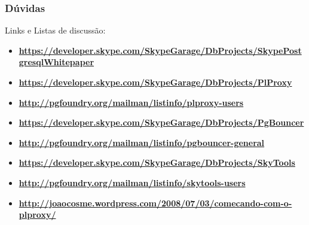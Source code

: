 \documentclass{beamer}
\begin{document}
\begin{frame}
    \frametitle{\textbf{Dúvidas}}

    \begin{block}{Links e Listas de discussão:}
        \begin{itemize}
            \item {\textbf{\tiny \url{https://developer.skype.com/SkypeGarage/DbProjects/SkypePostgresqlWhitepaper}}}
            \item {\textbf{\tiny \url{https://developer.skype.com/SkypeGarage/DbProjects/PlProxy}}}
            \item {\textbf{\tiny \url{http://pgfoundry.org/mailman/listinfo/plproxy-users}}}
            \item {\textbf{\tiny \url{https://developer.skype.com/SkypeGarage/DbProjects/PgBouncer}}}
            \item {\textbf{\tiny \url{http://pgfoundry.org/mailman/listinfo/pgbouncer-general}}}
            \item {\textbf{\tiny \url{https://developer.skype.com/SkypeGarage/DbProjects/SkyTools}}}
            \item {\textbf{\tiny \url{http://pgfoundry.org/mailman/listinfo/skytools-users}}}
            \item {\textbf{\tiny \url{http://joaocosme.wordpress.com/2008/07/03/comecando-com-o-plproxy/}}}
        \end{itemize}
    \end{block}

\end{frame}
\end{document}
